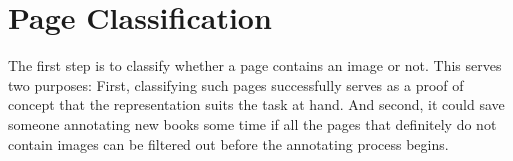 \section{Page Classification}
\label{sec:pageclas}

The first step is to classify whether a page contains an image or not. This
serves two purposes: First, classifying such pages successfully serves as a
proof of concept that the representation suits the task at hand. And second, it
could save someone annotating new books some time if all
the pages that definitely do not contain images can be filtered out before the
annotating process begins.
